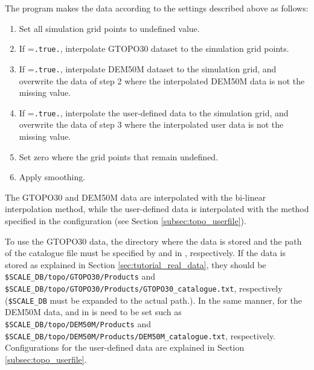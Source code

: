 The program makes the data according to the settings described above as follows:
\begin{enumerate}[1)]
 \item Set all simulation grid points to undefined value.
 \item If =\verb|.true.|, interpolate GTOPO30 dataset to the simulation grid points.
 \item If =\verb|.true.|, interpolate DEM50M dataset to the simulation grid, and overwrite the data of step 2 where the interpolated DEM50M data is not the missing value.
 \item If =\verb|.true.|, interpolate the user-defined data to the simulation grid, and overwrite the data of step 3 where the interpolated user data is not the missing value.
 \item Set zero where the grid points that remain undefined.
 \item Apply smoothing.
\end{enumerate}
The GTOPO30 and DEM50M data are interpolated with the bi-linear interpolation method, while the user-defined data is interpolated with the method specified in the configuration (see Section \ref{subsec:topo_userfile}).

To use the GTOPO30 data, the directory where the data is stored and the path of the catalogue file must be specified by  and  in , respectively.
If the data is stored as explained in Section \ref{sec:tutorial_real_data}, they should be \\ \verb|$SCALE_DB/topo/GTOPO30/Products| and \verb|$SCALE_DB/topo/GTOPO30/Products/GTOPO30_catalogue.txt|, respectively (\verb|$SCALE_DB| must be expanded to the actual path.).
In the same manner, for the DEM50M data,  and  in  is need to be set such as \verb|$SCALE_DB/topo/DEM50M/Products| and \\ \verb|$SCALE_DB/topo/DEM50M/Products/DEM50M_catalogue.txt|, respectively.
Configurations for the user-defined data are explained in Section \ref{subsec:topo_userfile}.

